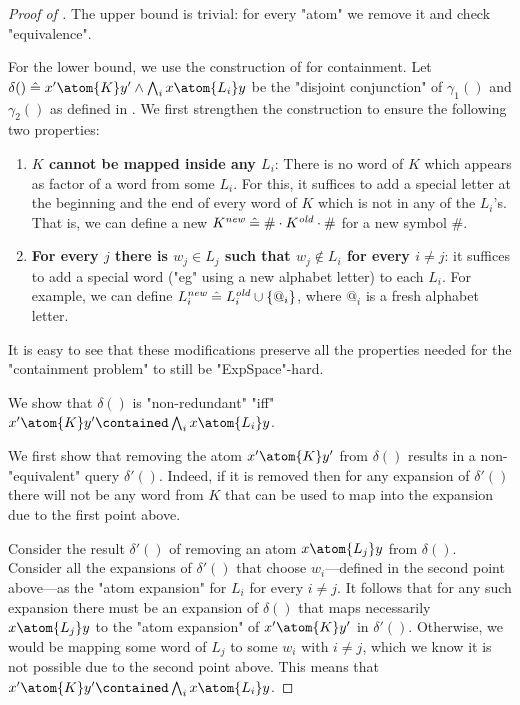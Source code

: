 \begin{proof}[Proof of ]
	The upper bound is trivial: for every "atom" we remove it and check "equivalence".
	
	For the lower bound, we use the construction of  for containment. Let $\delta() 
	\defeq x' \atom{K} y' \land \bigwedge_i x \atom{L_i} y$ be the "disjoint conjunction" of $\gamma_1()$ and $\gamma_2()$ as defined in .
	We first strengthen the construction to ensure the following two properties:
	\begin{enumerate}
		\item \textbf{$K$ cannot be mapped inside any $L_i$}: There is no word of $K$ which appears as factor of a word from some $L_i$. For this, it suffices to add a special letter at the beginning and the end of every word of $K$ which is not in any of the $L_i$'s. That is, we can define a new $K^{\textit{new}} \mathrel{\hat{=}} \# \cdot K^{\textit{old}} \cdot \#$ for a new symbol $\#$.
		\item \textbf{For every $j$ there is $w_j \in L_j$ such that $w_j \not\in L_i$ for every $i \neq j$}: it suffices to add a special word ("eg" using a new alphabet letter) to each $L_i$. For example, we can define $L_{i}^{\textit{new}} \mathrel{\hat{=}} L_{i}^\textit{old} \cup \{@_i\}$, where $@_i$ is a fresh alphabet letter.
	\end{enumerate}
	It is easy to see that these modifications preserve all the properties needed for the "containment problem" to still be "ExpSpace"-hard.
	
	We show that $\delta()$ is "non-redundant" "iff" $x' \atom{K} y' \contained \bigwedge_i x \atom{L_i} y$.
	
	 We first show that removing the atom $x' \atom{K} y'$ from $\delta()$ results in a non-"equivalent" query $\delta'()$. Indeed, if it is removed then for any expansion of $\delta'()$ there will not be any word from $K$ that can be used to map into the expansion due to the first point above.

	 Consider the result $\delta'()$ of removing an atom $x \atom{L_j} y$ from $\delta()$. Consider all the expansions of $\delta'()$ that choose $w_i$---defined in the second point above---as the "atom expansion" for $L_i$ for every $i \neq j$. It follows that for any such expansion there must be an expansion of $\delta()$ that maps necessarily $x \atom{L_j} y$ to the "atom expansion" of $x' \atom{K} y'$ in $\delta'()$. Otherwise, we would be mapping some word of $L_j$ to some $w_i$ with $i\neq j$, which we know it is not possible due to the second point above.
	This means that $x' \atom{K} y' \contained \bigwedge_i x \atom{L_i} y$.


\end{proof}

